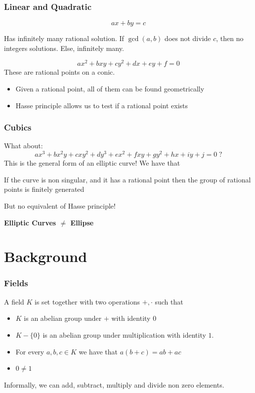 \documentclass{beamer}
\begin{document}
\begin{frame}
    \frametitle{Linear and Quadratic}
    \[ a x + b y = c \]
    \pause
    \begin{theorem}
        Has infinitely many rational solution. If $\gcd(a, b)$ does not divide $c$, then no integers solutions.
        Else, infinitely many.
    \end{theorem}
    \pause
    \[ a x^2 + b x y + c y^2  + d x + e y + f = 0 \]
    \pause
    These are rational points on a conic. 
    \begin{itemize}
        \item Given a rational point, all of them can be found geometrically
        \item Hasse principle allows us to test if a rational point exists
    \end{itemize}

\end{frame}

\begin{frame}
    \frametitle{Cubics}
    What about:
    \[ a x^3 + b x^2 y + c x y^2 + d y^3 + e x^2 + f x y + g y^2 + h x + i y + j = 0 \; ? \]
    \pause
    This is the general form of an elliptic curve!
    \pause
    We have that 
    \begin{theorem}[Mordell]
        If the curve is non singular, and it has a rational point then the group of rational points is finitely generated
    \end{theorem}
    \pause
    But no equivalent of Hasse principle!
    \pause
    \begin{center}
        \textbf{Elliptic Curves $\neq$ Ellipse}
    \end{center}
\end{frame}

\section{Background}
\begin{frame}
    \frametitle{Fields}
    \begin{definition}
        A field $K$ is set together with two operations $+, \cdot$ such that 
        \begin{itemize}
            \item $K$ is an abelian group under $+$ with identity $0$
            \item $K - \{ 0 \}$ is an abelian group under multiplication with identity $1$.
            \item For every $a,b,c \in K$ we have that $a (b + c) = ab + ac$
            \item $0 \neq 1$
        \end{itemize}
    \end{definition}
    \pause
    Informally, we can add, subtract, multiply and divide non zero elements.
\end{frame}
\end{document}

